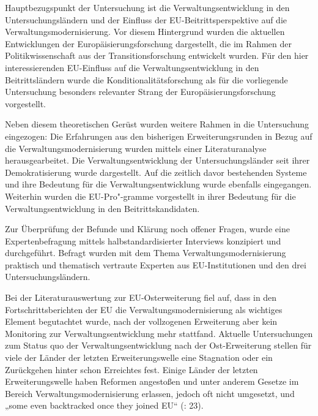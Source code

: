Hauptbezugspunkt der Untersuchung ist die Verwaltungsentwicklung in den Untersuchungsländern und der Einfluss der EU-Beitrittsperspektive auf die Verwaltungsmodernisierung. Vor diesem Hintergrund wurden die aktuellen Entwicklungen der Europäisierungsforschung dargestellt, die im Rahmen der Politikwissenschaft aus der Transitionsforschung entwickelt wurden. Für den hier interessierenden EU-Einfluss auf die Verwaltungsentwicklung in den Beitrittsländern wurde die Konditionalitätsforschung als für die vorliegende Untersuchung besonders relevanter Strang der Europäisierungsforschung vorgestellt.\par
Neben diesem theoretischen Gerüst wurden weitere Rahmen in die Untersuchung eingezogen: Die Erfahrungen aus den bisherigen Erweiterungsrunden in Bezug auf die Verwaltungsmodernisierung wurden mittels einer Literaturanalyse herausgearbeitet. Die Verwaltungsentwicklung der Untersuchungsländer seit ihrer Demokratisierung wurde dargestellt. Auf die zeitlich davor bestehenden Systeme und ihre Bedeutung für die Verwaltungsentwicklung wurde ebenfalls eingegangen. Weiterhin wurden die EU-Pro"-gramme vorgestellt in ihrer Bedeutung für die Verwaltungsentwicklung in den Beitrittskandidaten.\par
Zur Überprüfung der Befunde und Klärung noch offener Fragen, wurde eine Expertenbefragung mittels halbstandardisierter Interviews konzipiert und durchgeführt. Befragt wurden mit dem Thema Verwaltungsmodernisierung praktisch und thematisch vertraute Experten aus EU-Institutionen und den drei Untersuchungsländern.\par
Bei der Literaturauswertung zur EU-Osterweiterung fiel auf, dass in den Fortschrittsberichten der EU die Verwaltungsmodernisierung als wichtiges Element begutachtet wurde, nach der vollzogenen Erweiterung aber kein Monitoring zur Verwaltungsentwicklung mehr stattfand.
Aktuelle Untersuchungen zum Status quo der Verwaltungsentwicklung nach der Ost-Erweiterung stellen für viele der Länder der letzten Erweiterungswelle eine Stagnation oder ein Zurückgehen hinter schon Erreichtes fest. Einige Länder der letzten Erweiterungswelle haben Reformen angestoßen und unter anderem Gesetze im Bereich Verwaltungsmodernisierung erlassen, jedoch oft nicht umgesetzt, und „some even backtracked once they joined EU“ (\cite{pickering}: 23).\par
